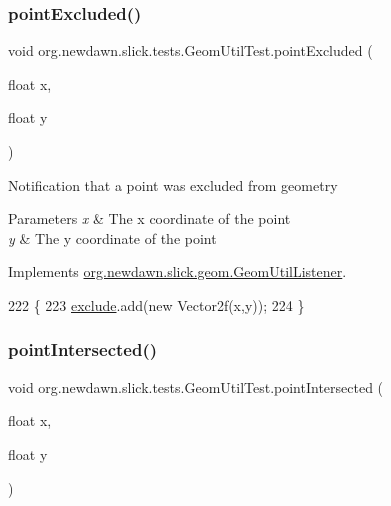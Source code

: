\subsubsection{\texorpdfstring{point\+Excluded()}{pointExcluded()}}
{\footnotesize\ttfamily void org.\+newdawn.\+slick.\+tests.\+Geom\+Util\+Test.\+point\+Excluded (\begin{DoxyParamCaption}\item[{float}]{x,  }\item[{float}]{y }\end{DoxyParamCaption})\hspace{0.3cm}{\ttfamily [inline]}}

Notification that a point was excluded from geometry


\begin{DoxyParams}{Parameters}
{\em x} & The x coordinate of the point \\
\hline
{\em y} & The y coordinate of the point \\
\hline
\end{DoxyParams}


Implements \mbox{\hyperlink{interfaceorg_1_1newdawn_1_1slick_1_1geom_1_1_geom_util_listener_ab800520173f64c032206777411644b4c}{org.\+newdawn.\+slick.\+geom.\+Geom\+Util\+Listener}}.


\begin{DoxyCode}
222                                                 \{
223         \mbox{\hyperlink{classorg_1_1newdawn_1_1slick_1_1tests_1_1_geom_util_test_ae81ed2cbfad947c569f76bdf2ec73da7}{exclude}}.add(\textcolor{keyword}{new} Vector2f(x,y));
224     \}
\end{DoxyCode}
\mbox{\label{classorg_1_1newdawn_1_1slick_1_1tests_1_1_geom_util_test_a5f8bb55e39757622e42b4820a7f6cf2a}} 
\subsubsection{\texorpdfstring{point\+Intersected()}{pointIntersected()}}
{\footnotesize\ttfamily void org.\+newdawn.\+slick.\+tests.\+Geom\+Util\+Test.\+point\+Intersected (\begin{DoxyParamCaption}\item[{float}]{x,  }\item[{float}]{y }\end{DoxyParamCaption})\hspace{0.3cm}{\ttfamily [inline]}}

